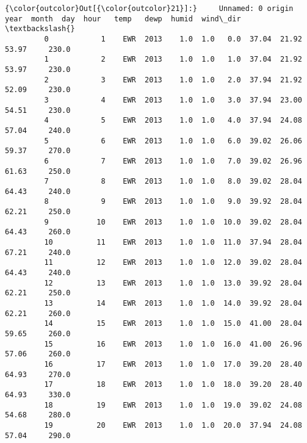 \documentclass[11pt]{article}
\begin{document}
\begin{Verbatim}[commandchars=\\\{\}]
{\color{outcolor}Out[{\color{outcolor}21}]:}     Unnamed: 0 origin  year  month  day  hour   temp   dewp  humid  wind\_dir  \textbackslash{}
         0            1    EWR  2013    1.0  1.0   0.0  37.04  21.92  53.97     230.0   
         1            2    EWR  2013    1.0  1.0   1.0  37.04  21.92  53.97     230.0   
         2            3    EWR  2013    1.0  1.0   2.0  37.94  21.92  52.09     230.0   
         3            4    EWR  2013    1.0  1.0   3.0  37.94  23.00  54.51     230.0   
         4            5    EWR  2013    1.0  1.0   4.0  37.94  24.08  57.04     240.0   
         5            6    EWR  2013    1.0  1.0   6.0  39.02  26.06  59.37     270.0   
         6            7    EWR  2013    1.0  1.0   7.0  39.02  26.96  61.63     250.0   
         7            8    EWR  2013    1.0  1.0   8.0  39.02  28.04  64.43     240.0   
         8            9    EWR  2013    1.0  1.0   9.0  39.92  28.04  62.21     250.0   
         9           10    EWR  2013    1.0  1.0  10.0  39.02  28.04  64.43     260.0   
         10          11    EWR  2013    1.0  1.0  11.0  37.94  28.04  67.21     240.0   
         11          12    EWR  2013    1.0  1.0  12.0  39.02  28.04  64.43     240.0   
         12          13    EWR  2013    1.0  1.0  13.0  39.92  28.04  62.21     250.0   
         13          14    EWR  2013    1.0  1.0  14.0  39.92  28.04  62.21     260.0   
         14          15    EWR  2013    1.0  1.0  15.0  41.00  28.04  59.65     260.0   
         15          16    EWR  2013    1.0  1.0  16.0  41.00  26.96  57.06     260.0   
         16          17    EWR  2013    1.0  1.0  17.0  39.20  28.40  64.93     270.0   
         17          18    EWR  2013    1.0  1.0  18.0  39.20  28.40  64.93     330.0   
         18          19    EWR  2013    1.0  1.0  19.0  39.02  24.08  54.68     280.0   
         19          20    EWR  2013    1.0  1.0  20.0  37.94  24.08  57.04     290.0   
         

\end{Verbatim}
\end{document}

